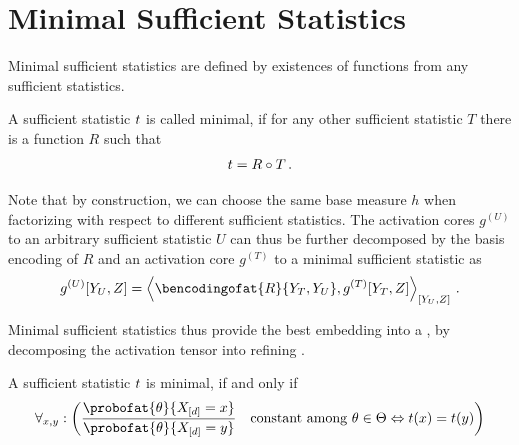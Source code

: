 \documentclass[aps,onecolumn,nofootinbib,pra]{article}
\begin{document}
    \section{Minimal Sufficient Statistics}

    Minimal sufficient statistics are defined by existences of functions from any sufficient statistics.

    \begin{definition}
        A sufficient statistic $t$ is called minimal, if for any other sufficient statistic $T$ there is a function $R$ such that
        \begin{align*}
            t = R \circ T \, .
        \end{align*}
    \end{definition}

    Note that by construction, we can choose the same base measure $h$ when factorizing with respect to different sufficient statistics.
    The activation cores $g^{(U)}$ to an arbitrary sufficient statistic $U$ can thus be further decomposed by the basis encoding of $R$ and an activation core $g^{(T)}$ to a minimal sufficient statistic as
    \begin{align*}
        g^{(U)}[\headvariableof{U},Z] = \contractionof{\bencodingofat{R}{\headvariableof{T},\headvariableof{U}},g^{(T)}[\headvariableof{T},Z]}{\headvariableof{U},Z} \, .
    \end{align*}

    Minimal sufficient statistics thus provide the best embedding into a \ComputationActivationNetworks{}, by decomposing the activation tensor into refining \ComputationActivationNetwork{}.

    \begin{theorem}
        A sufficient statistic $t$ is minimal, if and only if
        \begin{align*}
            \forall_{x,y} : \left( \frac{\probofat{\theta}{\shortcatvariables=x}}{\probofat{\theta}{\shortcatvariables=y}} \quad  \text{constant among $\theta\in\Theta$} \Leftrightarrow \sstat(x) = \sstat(y) \right)
        \end{align*}
    \end{theorem}
\end{document}
